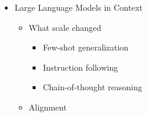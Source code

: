 \documentclass[
]{article}
\providecommand{\tightlist}{%
  \setlength{\itemsep}{0pt}\setlength{\parskip}{0pt}}
\begin{document}
\begin{itemize}
\begin{itemize}
    \begin{itemize}
    \tightlist
    \item
      Greedy decoding
    \item
      Beam search
    \item
      Sampling: temperature, top-\texttt{k}, top-\texttt{p} (nucleus)
    \item
      Contrastive decoding
    \end{itemize}
  \item
    Constrained generation

    \begin{itemize}
    \tightlist
    \item
      Hard constraints (regex, grammar)
    \item
      Soft constraints (style, length)
    \item
      Logit biasing
    \end{itemize}
  \item
    Controlled generation

    \begin{itemize}
    \tightlist
    \item
      Prompt engineering
    \item
      Conditional generation with control codes
    \item
      Reinforcement learning from human feedback (\texttt{RLHF})
    \end{itemize}
  \item
    Evaluation

    \begin{itemize}
    \tightlist
    \item
      Perplexity (intrinsic)
    \item
      Automated quality metrics
    \item
      Human evaluation rubrics
    \item
      Hallucination detection
    \end{itemize}
  \end{itemize}
\item
  Large Language Models in Context

  \begin{itemize}
  \tightlist
  \item
    What scale changed

    \begin{itemize}
    \tightlist
    \item
      Few-shot generalization
    \item
      Instruction following
    \item
      Chain-of-thought reasoning
    \end{itemize}
  \item
    Alignment


\end{itemize}
\end{itemize}
\end{document}
